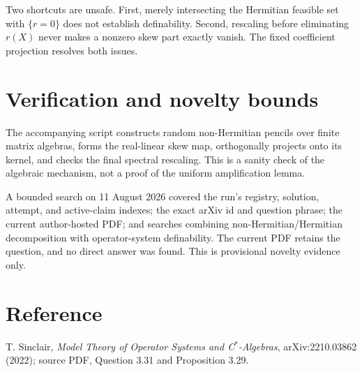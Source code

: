 \documentclass[11pt]{article}
\begin{document}
Two shortcuts are unsafe. First, merely intersecting the Hermitian feasible
set with $\{r=0\}$ does not establish definability. Second, rescaling before
eliminating $r(X)$ never makes a nonzero skew part exactly vanish. The fixed
coefficient projection resolves both issues.

\section{Verification and novelty bounds}

The accompanying script constructs random non-Hermitian pencils over finite
matrix algebras, forms the real-linear skew map, orthogonally projects onto
its kernel, and checks the final spectral rescaling. This is a sanity check of
the algebraic mechanism, not a proof of the uniform amplification lemma.

A bounded search on 11 August 2026 covered the run's registry, solution,
attempt, and active-claim indexes; the exact arXiv id and question phrase;
the current author-hosted PDF; and searches combining non-Hermitian/Hermitian
decomposition with operator-system definability. The current PDF retains the
question, and no direct answer was found. This is provisional novelty
evidence only.

\section*{Reference}

T. Sinclair, \emph{Model Theory of Operator Systems and C$^*$-Algebras},
arXiv:2210.03862 (2022); source PDF, Question 3.31 and Proposition 3.29.
\end{document}
